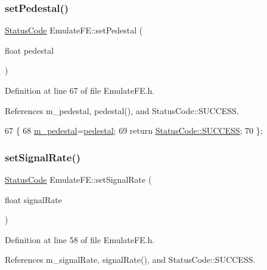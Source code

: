 \subsubsection{\texorpdfstring{set\+Pedestal()}{setPedestal()}}
{\footnotesize\ttfamily \hyperlink{classStatusCode}{Status\+Code} Emulate\+F\+E\+::set\+Pedestal (\begin{DoxyParamCaption}\item[{float}]{pedestal }\end{DoxyParamCaption})\hspace{0.3cm}{\ttfamily [inline]}}



Definition at line 67 of file Emulate\+F\+E.\+h.



References m\+\_\+pedestal, pedestal(), and Status\+Code\+::\+S\+U\+C\+C\+E\+SS.


\begin{DoxyCode}
67                                          \{
68     \hyperlink{classEmulateFE_a033996ce759c11305395ac865a6c074a}{m\_pedestal}=\hyperlink{classEmulateFE_a8442db97da7b2a97fe97745e6d8d9161}{pedestal};
69     \textcolor{keywordflow}{return} \hyperlink{classStatusCode_a6f565cbeadc76d14c72f047e5e85eb4badd0da38d3ba0d922efd1f4619bc37ad8}{StatusCode::SUCCESS};
70   \};
\end{DoxyCode}
\mbox{\label{classEmulateFE_ad785934c216c213e504f3db72b53354f}} 
\subsubsection{\texorpdfstring{set\+Signal\+Rate()}{setSignalRate()}}
{\footnotesize\ttfamily \hyperlink{classStatusCode}{Status\+Code} Emulate\+F\+E\+::set\+Signal\+Rate (\begin{DoxyParamCaption}\item[{float}]{signal\+Rate }\end{DoxyParamCaption})\hspace{0.3cm}{\ttfamily [inline]}}



Definition at line 58 of file Emulate\+F\+E.\+h.



References m\+\_\+signal\+Rate, signal\+Rate(), and Status\+Code\+::\+S\+U\+C\+C\+E\+SS.


